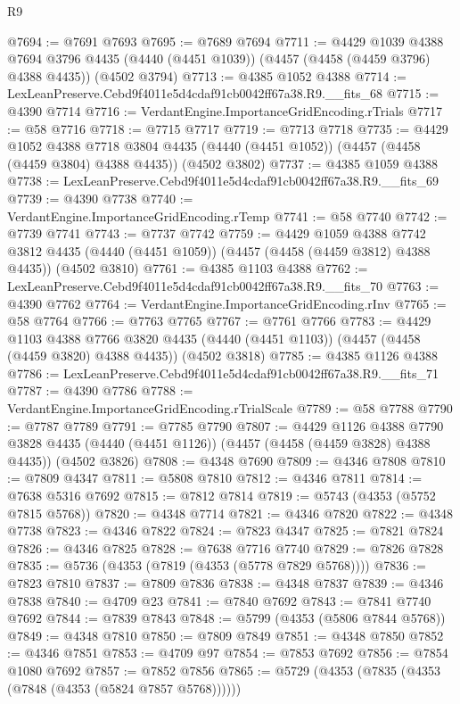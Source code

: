 \begin{lexlean}{R9}
\begin{coremodule}
@7694 := @7691 @7693
@7695 := @7689 @7694
@7711 := @4429
    @1039
    @4388
    @7694
    @3796
    @4435
    (@4440 (@4451 @1039))
    (@4457 (@4458 (@4459 @3796) @4388 @4435))
    (@4502 @3794)
@7713 := @4385 @1052 @4388
@7714 := LexLeanPreserve.Cebd9f4011e5d4cdaf91cb0042ff67a38.R9.__fits_68
@7715 := @4390 @7714
@7716 := VerdantEngine.ImportanceGridEncoding.rTrials
@7717 := @58 @7716
@7718 := @7715 @7717
@7719 := @7713 @7718
@7735 := @4429
    @1052
    @4388
    @7718
    @3804
    @4435
    (@4440 (@4451 @1052))
    (@4457 (@4458 (@4459 @3804) @4388 @4435))
    (@4502 @3802)
@7737 := @4385 @1059 @4388
@7738 := LexLeanPreserve.Cebd9f4011e5d4cdaf91cb0042ff67a38.R9.__fits_69
@7739 := @4390 @7738
@7740 := VerdantEngine.ImportanceGridEncoding.rTemp
@7741 := @58 @7740
@7742 := @7739 @7741
@7743 := @7737 @7742
@7759 := @4429
    @1059
    @4388
    @7742
    @3812
    @4435
    (@4440 (@4451 @1059))
    (@4457 (@4458 (@4459 @3812) @4388 @4435))
    (@4502 @3810)
@7761 := @4385 @1103 @4388
@7762 := LexLeanPreserve.Cebd9f4011e5d4cdaf91cb0042ff67a38.R9.__fits_70
@7763 := @4390 @7762
@7764 := VerdantEngine.ImportanceGridEncoding.rInv
@7765 := @58 @7764
@7766 := @7763 @7765
@7767 := @7761 @7766
@7783 := @4429
    @1103
    @4388
    @7766
    @3820
    @4435
    (@4440 (@4451 @1103))
    (@4457 (@4458 (@4459 @3820) @4388 @4435))
    (@4502 @3818)
@7785 := @4385 @1126 @4388
@7786 := LexLeanPreserve.Cebd9f4011e5d4cdaf91cb0042ff67a38.R9.__fits_71
@7787 := @4390 @7786
@7788 := VerdantEngine.ImportanceGridEncoding.rTrialScale
@7789 := @58 @7788
@7790 := @7787 @7789
@7791 := @7785 @7790
@7807 := @4429
    @1126
    @4388
    @7790
    @3828
    @4435
    (@4440 (@4451 @1126))
    (@4457 (@4458 (@4459 @3828) @4388 @4435))
    (@4502 @3826)
@7808 := @4348 @7690
@7809 := @4346 @7808
@7810 := @7809 @4347
@7811 := @5808 @7810
@7812 := @4346 @7811
@7814 := @7638 @5316 @7692
@7815 := @7812 @7814
@7819 := @5743 (@4353 (@5752 @7815 @5768))
@7820 := @4348 @7714
@7821 := @4346 @7820
@7822 := @4348 @7738
@7823 := @4346 @7822
@7824 := @7823 @4347
@7825 := @7821 @7824
@7826 := @4346 @7825
@7828 := @7638 @7716 @7740
@7829 := @7826 @7828
@7835 := @5736 (@4353 (@7819 (@4353 (@5778 @7829 @5768))))
@7836 := @7823 @7810
@7837 := @7809 @7836
@7838 := @4348 @7837
@7839 := @4346 @7838
@7840 := @4709 @23
@7841 := @7840 @7692
@7843 := @7841 @7740 @7692
@7844 := @7839 @7843
@7848 := @5799 (@4353 (@5806 @7844 @5768))
@7849 := @4348 @7810
@7850 := @7809 @7849
@7851 := @4348 @7850
@7852 := @4346 @7851
@7853 := @4709 @97
@7854 := @7853 @7692
@7856 := @7854 @1080 @7692
@7857 := @7852 @7856
@7865 := @5729 (@4353 (@7835 (@4353 (@7848 (@4353 (@5824 @7857 @5768))))))

\end{coremodule}
\end{lexlean}
